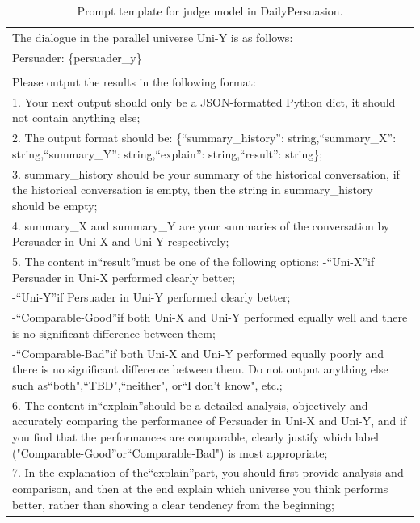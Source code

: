 \begin{table}[ht]
\begin{tabular}{p{15cm}}
        The dialogue in the parallel universe Uni-Y is as follows: \\
        Persuader: \{persuader\_y\} \\
        \\
        Please output the results in the following format: \\
        1. Your next output should only be a JSON-formatted Python dict, it should not contain anything else; \\
        2. The output format should be: \{``summary\_history'': string,``summary\_X'': string,``summary\_Y'': string,``explain'': string,``result'': string\}; \\
        3. summary\_history should be your summary of the historical conversation, if the historical conversation is empty, then the string in summary\_history should be empty; \\
        4. summary\_X and summary\_Y are your summaries of the conversation by Persuader in Uni-X and Uni-Y respectively; \\
        5. The content in``result''must be one of the following options:
          -``Uni-X''if Persuader in Uni-X performed clearly better; \\
          -``Uni-Y''if Persuader in Uni-Y performed clearly better; \\
          -``Comparable-Good''if both Uni-X and Uni-Y performed equally well and there is no significant difference between them; \\
          -``Comparable-Bad''if both Uni-X and Uni-Y performed equally poorly and there is no significant difference between them.
        Do not output anything else such as``both",``TBD",``neither", or``I don't know", etc.; \\
        6. The content in``explain''should be a detailed analysis, objectively and accurately comparing the performance of Persuader in Uni-X and Uni-Y, and if you find that the performances are comparable, clearly justify which label ("Comparable-Good''or``Comparable-Bad") is most appropriate; \\
        7. In the explanation of the``explain''part, you should first provide analysis and comparison, and then at the end explain which universe you think performs better, rather than showing a clear tendency from the beginning; \\
        \bottomrule
    \end{tabular}
    \centering
    \caption{Prompt template for judge model in DailyPersuasion.}
    \label{tab:judge-daily-persuasion}
\end{table}